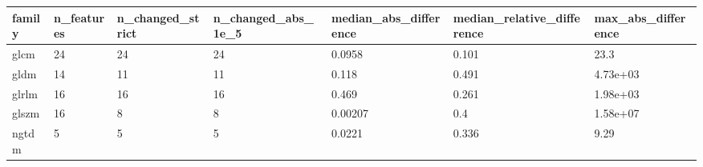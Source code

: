 \begin{tabular}{lllllll}
\toprule
family & n\_features & n\_changed\_strict & n\_changed\_abs\_1e\_5 & median\_abs\_difference & median\_relative\_difference & max\_abs\_difference \\
\midrule
glcm & 24 & 24 & 24 & 0.0958 & 0.101 & 23.3 \\
gldm & 14 & 11 & 11 & 0.118 & 0.491 & 4.73e+03 \\
glrlm & 16 & 16 & 16 & 0.469 & 0.261 & 1.98e+03 \\
glszm & 16 & 8 & 8 & 0.00207 & 0.4 & 1.58e+07 \\
ngtdm & 5 & 5 & 5 & 0.0221 & 0.336 & 9.29 \\
\bottomrule
\end{tabular}
